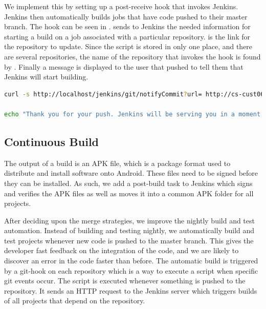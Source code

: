 We implement this by setting up a post-receive hook that invokes Jenkins. Jenkins then automatically builds jobs that have code pushed to their master branch. The hook can be seen in .  sends to Jenkins the needed information for starting a build on a job associated with a particular repository.  is the link for the repository to update. Since the script is stored in only one place, and there are several repositories, the name of the repository that invokes the hook is found by . Finally a message is displayed to the user that pushed to tell them that Jenkins will start building.

\begin{lstlisting}[language=bash,showstringspaces=false,caption=Git hook script,label=lst:hook_script_first]
curl -s http://localhost/jenkins/git/notifyCommit?url= http://cs-cust06-int.cs.aau.dk/git-ro/$(basename $(pwd)) > /dev/null

echo "Thank you for your push. Jenkins will be serving you in a moment."
\end{lstlisting}

\subsection{Continuous Build}
The output of a build is an APK file, which is a package format used to distribute and install software onto Android. These files need to be signed before they can be installed. As such, we add a post-build task to Jenkins which signs and verifies the APK files as well as moves it into a common APK folder for all projects.

After deciding upon the merge strategies, we improve the nightly build and test automation. Instead of building and testing nightly, we automatically build and test projects whenever new code is pushed to the master branch. This gives the developer fast feedback on the integration of the code, and we are likely to discover an error in the code faster than before. The automatic build is triggered by a git-hook on each repository which is a way to execute a script when specific git events occur. The script is executed whenever something is pushed to the repository. It sends an HTTP request to the Jenkins server which triggers builds of all projects that depend on the repository.

